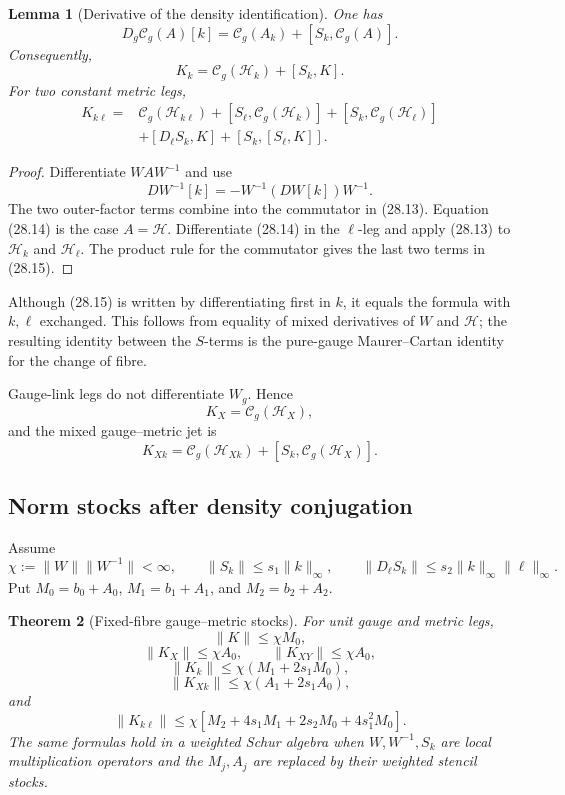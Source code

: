 \documentclass[11pt]{article}
\newtheorem{theorem}{Theorem}[section]
\newtheorem{lemma}[theorem]{Lemma}
\begin{document}
\begin{lemma}[Derivative of the density identification]
\label{lem:v11v28-density-derivative}
One has
\[
 D_g\mathcal C_g(A)[k]
 =
 \mathcal C_g(A_k)+[S_k,\mathcal C_g(A)].
 \tag{28.13}
\]
Consequently,
\[
 K_k=\mathcal C_g(\mathscr H_k)+[S_k,K].
 \tag{28.14}
\]
For two constant metric legs,
\[
 \begin{split}
 K_{k\ell}
 ={}&
 \mathcal C_g(\mathscr H_{k\ell})
 +[S_\ell,\mathcal C_g(\mathscr H_k)]
 +[S_k,\mathcal C_g(\mathscr H_\ell)]\\
 &+[D_\ell S_k,K]
 +[S_k,[S_\ell,K]].
 \end{split}
 \tag{28.15}
\]
\end{lemma}

\begin{proof}
Differentiate \(WAW^{-1}\) and use
\[
 D W^{-1}[k]=-W^{-1}(D W[k])W^{-1}.
\]
The two outer-factor terms combine into the commutator in (28.13).
Equation (28.14) is the case \(A=\mathscr H\).  Differentiate (28.14)
in the \(\ell\)-leg and apply (28.13) to
\(\mathscr H_k\) and \(\mathscr H_\ell\).  The product rule for the
commutator gives the last two terms in (28.15).
\end{proof}

Although (28.15) is written by differentiating first in \(k\), it equals
the formula with \(k,\ell\) exchanged.  This follows from equality of
mixed derivatives of \(W\) and \(\mathscr H\); the resulting identity
between the \(S\)-terms is the pure-gauge Maurer--Cartan identity for the
change of fibre.

Gauge-link legs do not differentiate \(W_g\).  Hence
\[
 K_X=\mathcal C_g(\mathscr H_X),
 \tag{28.16}
\]
and the mixed gauge--metric jet is
\[
 K_{Xk}
 =
 \mathcal C_g(\mathscr H_{Xk})
 +[S_k,\mathcal C_g(\mathscr H_X)].
 \tag{28.17}
\]

\subsection{Norm stocks after density conjugation}

Assume
\[
 \chi:=\|W\|\|W^{-1}\|<\infty,
 \qquad
 \|S_k\|\leq s_1\|k\|_\infty,
 \qquad
 \|D_\ell S_k\|
 \leq s_2\|k\|_\infty\|\ell\|_\infty.
 \tag{28.18}
\]
Put \(M_0=b_0+A_0\), \(M_1=b_1+A_1\), and
\(M_2=b_2+A_2\).

\begin{theorem}[Fixed-fibre gauge--metric stocks]
\label{thm:v11v28-fixed-fibre}
For unit gauge and metric legs,
\[
 \|K\|\leq\chi M_0,
 \tag{28.19}
\]
\[
 \|K_X\|\leq\chi A_0,\qquad
 \|K_{XY}\|\leq\chi A_0,
 \tag{28.20}
\]
\[
 \|K_k\|
 \leq\chi(M_1+2s_1M_0),
 \tag{28.21}
\]
\[
 \|K_{Xk}\|
 \leq\chi(A_1+2s_1A_0),
 \tag{28.22}
\]
and
\[
 \|K_{k\ell}\|
 \leq
 \chi\left[
 M_2+4s_1M_1+2s_2M_0+4s_1^2M_0
 \right].
 \tag{28.23}
\]
The same formulas hold in a weighted Schur algebra when
\(W,W^{-1},S_k\) are local multiplication operators and the \(M_j,A_j\)
are replaced by their weighted stencil stocks.
\end{theorem}
\end{document}
